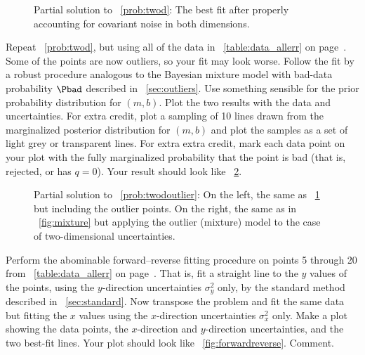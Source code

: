 \documentclass[12pt,twoside,pdftex]{article}
\begin{document}
\begin{figure}[htbp]
\caption{Partial solution to \problemname~\ref{prob:twod}: The best
fit after properly accounting for covariant noise in both
dimensions.}\label{fig:twod}
\end{figure}

\begin{problem}\label{prob:twodoutlier}
Repeat \problemname~\ref{prob:twod}, but using all of the data in
\tablename~\ref{table:data_allerr} on
page~\pageref{table:data_allerr}.  Some of the points are now
outliers, so your fit may look worse.  Follow the fit by a robust
procedure analogous to the Bayesian mixture model with bad-data
probability $\Pbad$ described in \sectionname~\ref{sec:outliers}.  Use
something sensible for the prior probability distribution for $(m,b)$.
Plot the two results with the data and uncertainties.  For extra
credit, plot a sampling of 10 lines drawn from the marginalized
posterior distribution for $(m,b)$ and plot the samples as a set of
light grey or transparent lines.  For extra extra credit, mark each
data point on your plot with the fully marginalized probability that
the point is bad (that is, rejected, or has $q=0$).  Your result
should look like \figurename~\ref{fig:twodoutlier}.
\end{problem}

\begin{figure}[htbp]
\caption{Partial solution to \problemname~\ref{prob:twodoutlier}: On
the left, the same as \figurename~\ref{fig:twod} but including the
outlier points.  On the right, the same as in
\figurename~\ref{fig:mixture} but applying the outlier (mixture) model
to the case of two-dimensional uncertainties.}\label{fig:twodoutlier}
\end{figure}

\begin{problem}\label{prob:forwardreverse}
Perform the abominable forward--reverse fitting procedure on points 5
through 20 from \tablename~\ref{table:data_allerr} on
page~\pageref{table:data_allerr}.  That is, fit a straight line to the
$y$ values of the points, using the $y$-direction uncertainties
$\sigma_y^2$ only, by the standard method described in
\sectionname~\ref{sec:standard}.  Now transpose the problem and fit
the same data but fitting the $x$ values using the $x$-direction
uncertainties $\sigma_x^2$ only.  Make a plot showing the data points,
the $x$-direction and $y$-direction uncertainties, and the two
best-fit lines.  Your plot should look like
\figurename~\ref{fig:forwardreverse}.  Comment.
\end{problem}
\end{document}
